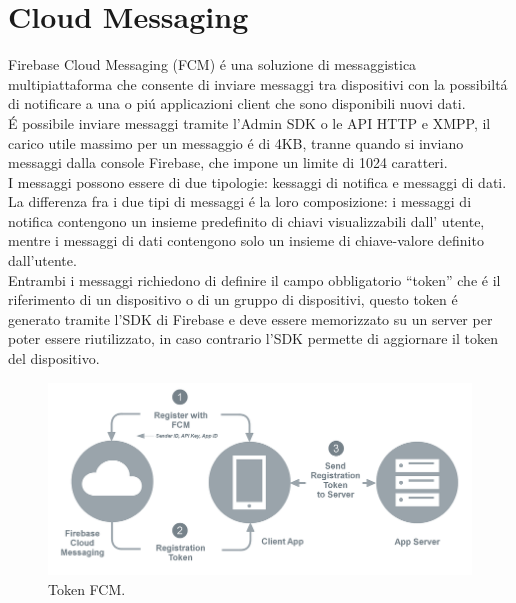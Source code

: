 \newpage
\section{Cloud Messaging}                 %
Firebase Cloud Messaging (FCM) \'e una soluzione di messaggistica multipiattaforma che consente di inviare messaggi tra dispositivi con la possibilt\'a di notificare a una o pi\'u applicazioni client che sono disponibili nuovi dati.\\
\'E possibile inviare messaggi tramite l'Admin SDK o le API HTTP e XMPP, il carico utile massimo per un messaggio \'e di 4KB, tranne quando si inviano messaggi dalla console Firebase, che impone un limite di 1024 caratteri.\\
I messaggi possono essere di due tipologie: kessaggi di notifica e messaggi di dati.
La differenza fra i due tipi di messaggi \'e la loro composizione: i messaggi di notifica contengono un insieme predefinito di chiavi visualizzabili dall' utente, mentre i messaggi di dati contengono solo un insieme di chiave-valore definito dall'utente.\\
Entrambi i messaggi richiedono di definire il campo obbligatorio ``token'' che \'e il riferimento di un dispositivo o di un gruppo di dispositivi, questo token \'e generato tramite l'SDK di Firebase e deve essere memorizzato su un server per poter essere riutilizzato, in caso contrario l'SDK permette di aggiornare il token del dispositivo.

\begin{figure}[!hb]
  \centering
  \includegraphics[width=1\textwidth]{immagini/fcm_token.png}
  \caption{Token FCM.}
  \label{fig:Token FCM}
\end{figure}

